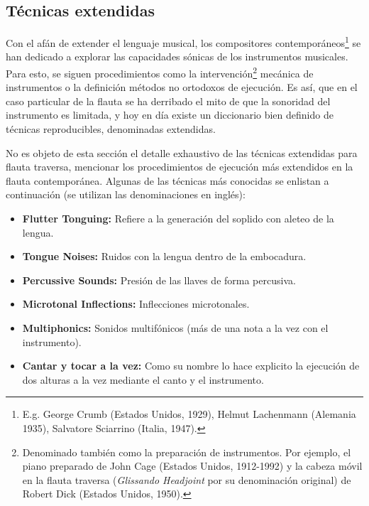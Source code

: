 \documentclass
  [ams,pdfout]%
	{aeslac}
\begin{document}
\subsection{Técnicas extendidas}

Con el afán de extender el lenguaje musical, los compositores contemporáneos\footnote{E.g. George Crumb (Estados Unidos, 1929), Helmut Lachenmann (Alemania 1935), Salvatore Sciarrino (Italia, 1947).} se han dedicado a explorar las capacidades sónicas de los instrumentos musicales. Para esto, se siguen procedimientos como la intervención\footnote{Denominado también como la preparación de instrumentos. Por ejemplo, el piano preparado de John Cage (Estados Unidos, 1912-1992) y la cabeza móvil en la flauta traversa (\textit{Glissando Headjoint} por su denominación original) de Robert Dick (Estados Unidos, 1950).} mecánica de instrumentos o la definición métodos no ortodoxos de ejecución. Es así, que en el caso particular de la flauta se ha derribado el mito de que la sonoridad del instrumento es limitada, y hoy en día existe un diccionario bien definido de técnicas reproducibles, denominadas extendidas\cite{dick1975other}.

No es objeto de esta sección el detalle exhaustivo de las técnicas extendidas para flauta traversa, mencionar los procedimientos de ejecución más extendidos en la flauta contemporánea. Algunas de las técnicas más conocidas se enlistan a continuación (se utilizan las denominaciones en inglés):

\begin{itemize}

\item \textbf{Flutter Tonguing:} Refiere a la generación del soplido con aleteo de la lengua. 
\item \textbf{Tongue Noises:} Ruidos con la lengua dentro de la embocadura. 
\item \textbf{Percussive Sounds:} Presión de las llaves de forma percusiva.
\item \textbf{Microtonal Inflections:} Inflecciones microtonales.
\item \textbf{Multiphonics:} Sonidos multifónicos (más de una nota a la vez con el instrumento).
\item \textbf{Cantar y tocar a la vez:} Como su nombre lo hace explicito la ejecución de dos alturas a la vez mediante el canto y el instrumento.

\end{itemize}
\end{document}

